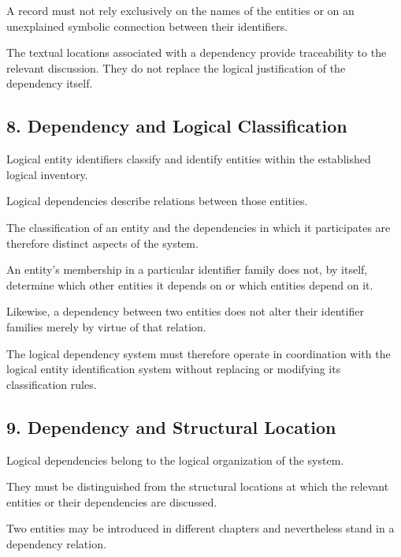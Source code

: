 A record must not rely exclusively
on the names of the entities
or on an unexplained symbolic
connection between their
identifiers.

The textual locations associated
with a dependency provide
traceability to the relevant
discussion. They do not replace
the logical justification
of the dependency itself.


\subsection*{8. Dependency and Logical Classification}

Logical entity identifiers
classify and identify entities
within the established logical
inventory.

Logical dependencies describe
relations between those entities.

The classification of an entity
and the dependencies in which
it participates are therefore
distinct aspects of the system.

An entity's membership in a
particular identifier family
does not, by itself, determine
which other entities it depends
on or which entities depend
on it.

Likewise, a dependency between
two entities does not alter
their identifier families
merely by virtue of that
relation.

The logical dependency system
must therefore operate in
coordination with the logical
entity identification system
without replacing or modifying
its classification rules.


\subsection*{9. Dependency and Structural Location}

Logical dependencies belong
to the logical organization
of the system.

They must be distinguished
from the structural locations
at which the relevant entities
or their dependencies are
discussed.

Two entities may be introduced
in different chapters and
nevertheless stand in a
dependency relation.

